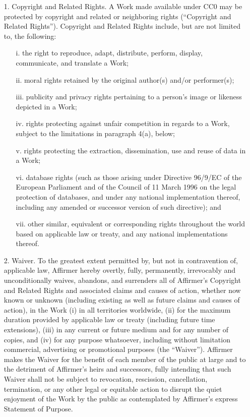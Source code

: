 \begin{enumerate}
\item[1.] Copyright and Related Rights. A Work made available under CC0 may be
protected by copyright and related or neighboring rights (``Copyright and
Related Rights''). Copyright and Related Rights include, but are not limited
to, the following:

	\begin{enumerate}
		\item[i.] the right to reproduce, adapt, distribute, perform, display, communicate,
  and translate a Work;

		\item[ii.] moral rights retained by the original author(s) and/or performer(s);

		\item[iii.] publicity and privacy rights pertaining to a person's image or likeness
  depicted in a Work;

		\item[iv.] rights protecting against unfair competition in regards to a Work,
  subject to the limitations in paragraph 4(a), below;

		\item[v.] rights protecting the extraction, dissemination, use and reuse of data in
  a Work;

		\item[vi.] database rights (such as those arising under Directive 96/9/EC of the
  European Parliament and of the Council of 11 March 1996 on the legal
  protection of databases, and under any national implementation thereof,
  including any amended or successor version of such directive); and

		\item[vii.] other similar, equivalent or corresponding rights throughout the world
  based on applicable law or treaty, and any national implementations thereof.
	\end{enumerate}
	
\item[2.] Waiver. To the greatest extent permitted by, but not in contravention of,
applicable law, Affirmer hereby overtly, fully, permanently, irrevocably and
unconditionally waives, abandons, and surrenders all of Affirmer's Copyright
and Related Rights and associated claims and causes of action, whether now
known or unknown (including existing as well as future claims and causes of
action), in the Work (i) in all territories worldwide, (ii) for the maximum
duration provided by applicable law or treaty (including future time
extensions), (iii) in any current or future medium and for any number of
copies, and (iv) for any purpose whatsoever, including without limitation
commercial, advertising or promotional purposes (the ``Waiver''). Affirmer makes
the Waiver for the benefit of each member of the public at large and to the
detriment of Affirmer's heirs and successors, fully intending that such Waiver
shall not be subject to revocation, rescission, cancellation, termination, or
any other legal or equitable action to disrupt the quiet enjoyment of the Work
by the public as contemplated by Affirmer's express Statement of Purpose.


\end{enumerate}
